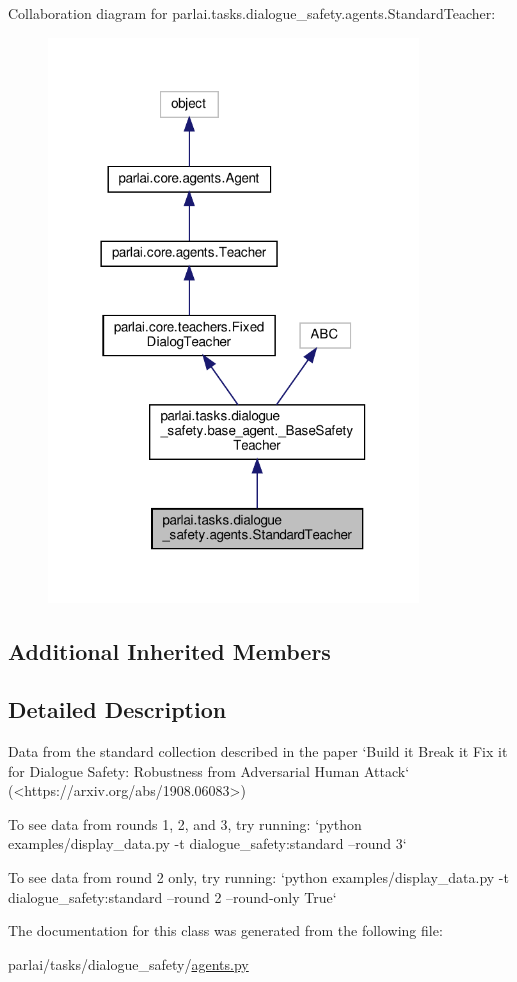 Collaboration diagram for parlai.\+tasks.\+dialogue\+\_\+safety.\+agents.\+Standard\+Teacher\+:
\nopagebreak
\begin{figure}[H]
\begin{center}
\leavevmode
\includegraphics[width=278pt]{classparlai_1_1tasks_1_1dialogue__safety_1_1agents_1_1StandardTeacher__coll__graph}
\end{center}
\end{figure}
\subsection*{Additional Inherited Members}


\subsection{Detailed Description}
\begin{DoxyVerb}Data from the standard collection described in the paper `Build it Break it Fix it
for Dialogue Safety: Robustness from Adversarial Human Attack`
(<https://arxiv.org/abs/1908.06083>)

To see data from rounds 1, 2, and 3, try running:
`python examples/display_data.py -t dialogue_safety:standard --round 3`

To see data from round 2 only, try running:
`python examples/display_data.py -t dialogue_safety:standard --round 2
 --round-only True`
\end{DoxyVerb}
 

The documentation for this class was generated from the following file\+:\begin{DoxyCompactItemize}
\item 
parlai/tasks/dialogue\+\_\+safety/\hyperlink{parlai_2tasks_2dialogue__safety_2agents_8py}{agents.\+py}\end{DoxyCompactItemize}
